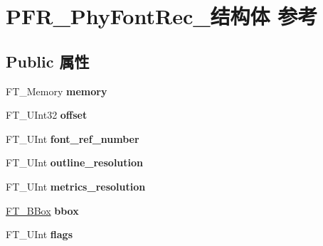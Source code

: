 \hypertarget{struct_p_f_r___phy_font_rec__}{}\section{P\+F\+R\+\_\+\+Phy\+Font\+Rec\+\_\+结构体 参考}
\label{struct_p_f_r___phy_font_rec__}
\subsection*{Public 属性}
\begin{DoxyCompactItemize}
\item 
\mbox{\label{struct_p_f_r___phy_font_rec___a7cdfd1e748add127a842f5ce4aaa1e87}} 
F\+T\+\_\+\+Memory {\bfseries memory}
\item 
\mbox{\label{struct_p_f_r___phy_font_rec___a039bfe20aac94a3b543a3a5e729cc514}} 
F\+T\+\_\+\+U\+Int32 {\bfseries offset}
\item 
\mbox{\label{struct_p_f_r___phy_font_rec___acae080e46cefe0a944a22934d74463be}} 
F\+T\+\_\+\+U\+Int {\bfseries font\+\_\+ref\+\_\+number}
\item 
\mbox{\label{struct_p_f_r___phy_font_rec___a0cec8ec87a0e441c9d9ff0af6e821945}} 
F\+T\+\_\+\+U\+Int {\bfseries outline\+\_\+resolution}
\item 
\mbox{\label{struct_p_f_r___phy_font_rec___a80aa46f6ce599f9ae1ba10c453794221}} 
F\+T\+\_\+\+U\+Int {\bfseries metrics\+\_\+resolution}
\item 
\mbox{\label{struct_p_f_r___phy_font_rec___a33e29eaf5b8b30005b9ac4b71d400414}} 
\hyperlink{struct_f_t___b_box__}{F\+T\+\_\+\+B\+Box} {\bfseries bbox}
\item 
\mbox{\label{struct_p_f_r___phy_font_rec___a20a0d280c7fa821813ee8f48a2aca38c}} 
F\+T\+\_\+\+U\+Int {\bfseries flags}
\item 
\mbox{\label{struct_p_f_r___phy_font_rec___ac07cc142af0d7cb93d02b2d327850c9c}} 

\end{DoxyCompactItemize}
